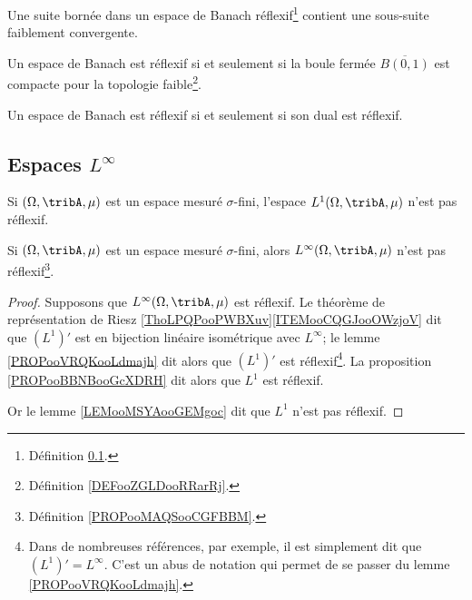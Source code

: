 \begin{proposition}       \label{PROPooPVVYooMZjQSq}
    Une suite bornée dans un espace de Banach réflexif\footnote{Définition \ref{}.} contient une sous-suite faiblement convergente.
\end{proposition}

\begin{theorem}       \label{THOooTFIHooPQjVAr}
Un espace de Banach est réflexif si et seulement si la boule fermée \( \overline{ B(0,1) }\) est compacte pour la topologie faible\footnote{Définition \ref{DEFooZGLDooRRarRj}.}.
\end{theorem}

\begin{proposition}       \label{PROPooBBNBooGcXDRH}
Un espace de Banach est réflexif si et seulement si son dual est réflexif.
\end{proposition}

\subsection{Espaces \texorpdfstring{\(  L^{\infty}\)}{Linfinity}}

\begin{lemma}        \label{LEMooMSYAooGEMgoc}
Si \( (\Omega,\tribA,\mu)\) est un espace mesuré \( \sigma\)-fini, l'espace \( L^1(\Omega,\tribA,\mu)\) n'est pas réflexif.
\end{lemma}

\begin{lemma}     \label{LEMooUSXTooFvpsVd}
    Si \( (\Omega,\tribA,\mu)\) est un espace mesuré \( \sigma\)-fini, alors \( L^{\infty}(\Omega,\tribA,\mu)\) n'est pas réflexif\footnote{Définition \ref{PROPooMAQSooCGFBBM}.}.
\end{lemma}

\begin{proof}
Supposons que \( L^{\infty}(\Omega,\tribA,\mu)\) est réflexif. Le théorème de représentation de Riesz \ref{ThoLPQPooPWBXuv}\ref{ITEMooCQGJooOWzjoV} dit que \( (L^1)'\) est en bijection linéaire isométrique avec \( L^{\infty}\); le lemme \ref{PROPooVRQKooLdmajh} dit alors que \( (L^1)'\) est réflexif\footnote{Dans de nombreuses références, par exemple\cite{BIBooFDGQooYferue}, il est simplement dit que \( (L^1)'=L^{\infty}\). C'est un abus de notation qui permet de se passer du lemme \ref{PROPooVRQKooLdmajh}.}. La proposition \ref{PROPooBBNBooGcXDRH} dit alors que \( L^1\) est réflexif.

Or le lemme \ref{LEMooMSYAooGEMgoc} dit que \( L^1\) n'est pas réflexif.
\end{proof}



